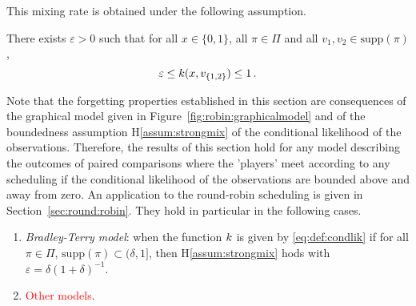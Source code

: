 This mixing rate is obtained under the following assumption.
\begin{hypH}
\label{assum:strongmix}
There exists $\varepsilon>0$ such that for all $x\in\{0,1\}$, all $\pi\in\Pi$ and all $v_1,v_2 \in \mathrm{supp}(\pi)$ , 
\begin{equation}
\label{eq:bound:likelihood}
\varepsilon\le k(x,v_{\{1,2\}})\le 1\,.
\end{equation}
\end{hypH}
Note that the forgetting properties established in this section are consequences of the graphical model given in Figure~\ref{fig:robin:graphicalmodel} and of the boundedness assumption H\ref{assum:strongmix} of the conditional likelihood of the observations. Therefore, the results of this section hold for any model describing the outcomes of paired comparisons where the 'players' meet according to any scheduling if the conditional likelihood of the observations are bounded above and away from zero. An application to the round-robin scheduling is given in Section~\ref{sec:round:robin}. They hold in particular in the following cases.
\begin{enumerate}[-]
\item {\em Bradley-Terry model}: when the function $k$ is given by \eqref{eq:def:condlik} if for all $\pi \in\Pi$, $\mathrm{supp}(\pi) \subset (\delta,1]$, then H\ref{assum:strongmix} hods with $\varepsilon=\delta(1+\delta)^{-1}$.
\item \textcolor{red}{Other models}.
\end{enumerate}
